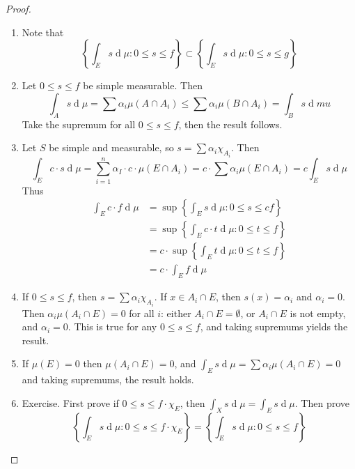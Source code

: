 \documentclass[12pt, a4paper]{book}
\renewcommand{\d}[1]{\ensuremath{\operatorname{d}\!{#1}}} %
\theoremstyle{nonumberplain}
\newtheorem{proof}{Proof}
\begin{document}
\begin{proof}
    \begin{enumerate}
        \item Note that
            \begin{equation*}
                \left\{\int_E s\d{\mu}:0\leq s\leq f\right\}\subset\left\{\int_E s\d{\mu}:0\leq s\leq g\right\}
            \end{equation*}
        \item Let $0\leq s\leq f$ be simple measurable.
            Then
            \[\int_A s\d{\mu}=\sum\limits\alpha_i\mu(A\cap A_i)\leq \sum\alpha_i\mu(B\cap A_i)=\int_B s\d{mu}\]
            Take the supremum for all $0\leq s\leq f$, then the result follows.
        \item Let $S$ be simple and measurable, so $s=\sum \alpha_i\chi_{A_i}$.
            Then
            \[\int_Ec\cdot s\d{\mu}=\sum\limits_{i=1}^n\alpha_I\cdot c\cdot \mu(E\cap A_i)=c\cdot\sum\alpha_i\mu(E\cap A_i)=c\int_Es\d{\mu}\]
            Thus
            \begin{align*}
                \int_Ec\cdot f\d{\mu}&=\sup\left\{\int_E s\d{\mu}:0\leq s\leq cf\right\}\\
                                     &=\sup\left\{\int_E c\cdot t\d{\mu}:0\leq t\leq f\right\}\\
                                     &=c\cdot\sup\left\{\int_E t\d{\mu}:0\leq t\leq f\right\}\\
                                     &= c\cdot\int_E f\d{\mu}
            \end{align*}
        \item If $0\leq s\leq f$, then $s=\sum \alpha_i\chi_{A_i}$.
            If $x\in A_i\cap E$, then $s(x)=\alpha_i$ and $\alpha_i=0$.
            Then $\alpha_i\mu(A_i\cap E)=0$ for all $i$: either $A_i\cap E=\emptyset$, or $A_i\cap E$ is not empty, and $\alpha_i=0$.
            This is true for any $0\leq s\leq f$, and taking supremums yields the result.
        \item If $\mu(E)=0$ then $\mu(A_i\cap E)=0$, and $\int_E s\d{\mu}=\sum\alpha_i\mu(A_i\cap E)=0$ and taking supremums, the result holds.
        \item Exercise.
            First prove if $0\leq s\leq f\cdot\chi_E$, then $\int_X s\d{\mu}=\int_E s\d{\mu}$.
            Then prove
            \begin{equation*}\left\{\int_E s\d{\mu}:0\leq s\leq f\cdot\chi_E\right\}=\left\{\int_E s\d{\mu}:0\leq s\leq f\right\}\end{equation*}
    \end{enumerate}
\end{proof}
\end{document}
